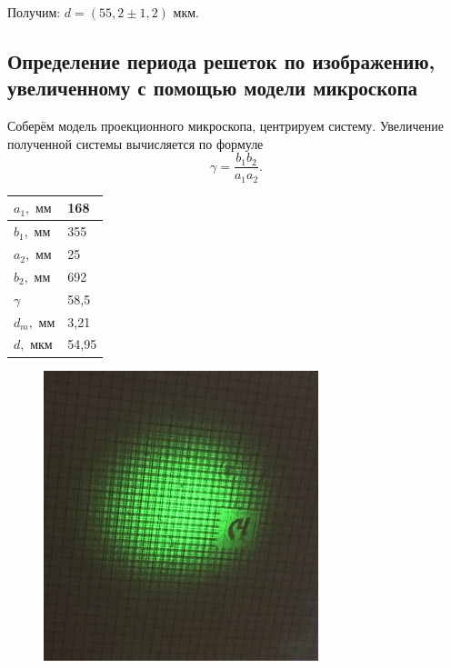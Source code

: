 \documentclass[a4paper,12pt]{article} %
\begin{document}
\noindent Получим: $d = (55,2 \pm 1,2) \text{ мкм}.$

\subsection{Определение периода решеток по изображению, увеличенному с помощью модели микроскопа}


    


\noindent Соберём модель проекционного микроскопа, центрируем систему. Увеличение полученной системы вычисляется по формуле
    \begin{equation}
        \gamma = \frac{b_1 b_2}{a_1 a_2}.
\end{equation}

\newpage

\begin{table}[h!]
\begin{tabular}{|l|l|}
\hline
$a_1, \text{ мм}$  & 168      \\ \hline
$b_1, \text{ мм}$  & 355      \\ \hline
$a_2, \text{ мм}$  & 25       \\ \hline
$b_2, \text{ мм}$  & 692      \\ \hline
$\gamma$          & 58,5    \\ \hline
$d_m, \text{ мм}$ & 3,21     \\ \hline
$d, \text{ мкм}$  & 54,95 \\ \hline
\end{tabular}
\end{table}

\begin{figure}[h]
    \centering
    \includegraphics[width=8cm]{2.jpg}
        \label{filtr}
\end{figure}
\end{document}
